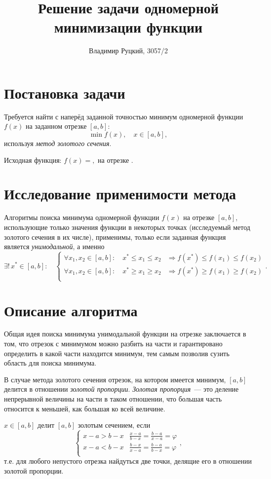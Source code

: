 \documentclass[10pt,a4paper,titlepage]{article}
\title{Решение задачи одномерной минимизации функции}
\author{Владимир Руцкий, 3057/2}
\begin{document}
\maketitle
\thispagestyle{empty}

\section{Постановка задачи}
Требуется найти с наперёд заданной точностью минимум одномерной функции $f(x)$ на заданном отрезке $[a, b]$:
$$ \min f(x), \quad x \in [a, b], $$
используя \textit{метод золотого сечения}.

Исходная функция: $f(x) = ,$ на отрезке $.$

\section{Исследование применимости метода}
Алгоритмы поиска минимума одномерной функции $f(x)$ на отрезке $[a, b]$, 
использующие только значения функции в некоторых точках 
(исследуемый метод золотого сечения в их числе), применимы, только
если заданная функция является \textit{унимодальной}, а именно
$$ \exists ! \, x^* \in [a, b]: \quad
\begin{cases}
  \forall x_1, x_2 \in [a,b]: \quad x^* \leqslant x_1 \leqslant x_2 & \Rightarrow f(x^*) \leqslant f(x_1) \leqslant f(x_2) \\
  \forall x_1, x_2 \in [a,b]: \quad x^* \geqslant x_1 \geqslant x_2 & \Rightarrow f(x^*) \geqslant f(x_1) \geqslant f(x_2) \\
\end{cases}.
$$

\section{Описание алгоритма}
Общая идея поиска минимума унимодальной функции на отрезке заключается в том, 
что отрезок с минимумом можно разбить на части и гарантировано определить в какой части находится минимум,
тем самым позволив сузить область для поиска минимума.

В случае метода золотого сечения отрезок, на котором имеется минимум, $[a,b]$ делится в отношении 
\textit{золотой пропорции}.
\textit{Золотая пропорция}~--- это деление непрерывной величины на части в таком отношении, 
что большая часть относится к меньшей, как большая ко всей величине.

$x \in [a,b]$ делит $[a,b]$ золотым сечением, если 
$$
\begin{cases}
  x - a > b - x &  \frac{x - a}{b - x} = \frac{b - a}{x - a} = \varphi \\
  x - a < b - x &  \frac{b - x}{x - a} = \frac{b - a}{b - x} = \varphi \\
\end{cases},
$$
т.е. для любого непустого отрезка найдуться две точки, делящие его в отношении золотой пропорции.
\end{document}
